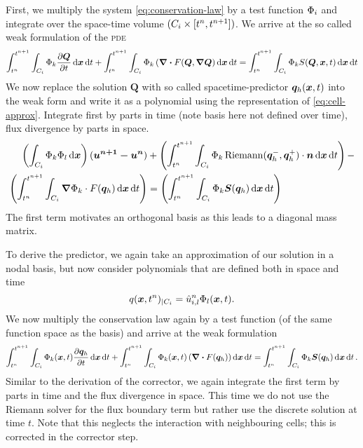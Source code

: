 First, we multiply the system \cref{eq:conservation-law} by a test function $\Phi_{i}$ and integrate over the space-time volume $(C_{i} \times [t^n, t^{n+1}])$.
We arrive at the so called weak formulation of the \textsc{pde} 
\begin{equation}
  \label{eq:weak-pde}
\intdt{\intdcell{
\testfunction{k} \pdv{\Q}{t}
}}
+
\intdt{\intdcell{
    \testfunction{k} \left( \div{F(\Q, \gradQ} \right)
}}
=
\intdt{\intdcell{
    \testfunction{k} S(\Q, \bm{x}, t)
}}
\end{equation}
We now replace the solution $\bm{Q}$ with so called spacetime-predictor $\bm{q}_{h} (\bm{x},t)$ into the weak form and write it as a polynomial using the representation of \cref{eq:cell-approx}.
Integrate first by parts in time (note basis here not defined over time), flux divergence by parts in space.
\begin{align}
\begin{split}
\label{eq:corrector}
\left(
\intdcell{
  \testfunction{k} \sbasis{l}
}
\right)
(\bm{u^{n+1} - u^{n}})
&+
\left(\intdt{\intdcell{
      \testfunction{k} \Riemann(\stpredictor^-, \stpredictor^+) \cdot \normal
}}\right)
-\\
\left(\intdt{\intdcell{
    \gradient{\testfunction{k}} \cdot  \flux(\stpredictor)
}}\right)
&=
\left(\intdt{\intdcell{
      \testfunction{k} \source(\stpredictor)
}}\right)
\end{split}
\end{align}
The first term motivates an orthogonal basis as this leads to a diagonal mass matrix.

To derive the predictor, we again take an approximation of our solution in a nodal basis, but now consider polynomials that are defined both in space and time
\begin{equation}
  \label{eq:cell-approx-space-time}
  q(\bm{x}, t^n)_{|\cell[i]} = \hat{u}^n_{i,l} \stbasis{l}(\bm{x}, t).
\end{equation}
We now multiply the conservation law again by a test function (of the same function space as the basis) and arrive at the weak formulation
\begin{equation}\label{eq:weak-pde-space-time}
\intdt{\intdcell{
    \testfunction{k}(\bm{x}, t)
    \pdv{\stpredictor}{t}
}}
+
\intdt{\intdcell{
    \testfunction{k}(\bm{x}, t)
    \left(
      \divergence{\flux(\stpredictor)}
    \right)
}}
=
\intdt{\intdcell{
  \testfunction{k} \source(\stpredictor)
}}.
\end{equation}
Similar to the derivation of the corrector, we again integrate the first term by parts in time and the flux divergence in space.
This time we do not use the Riemann solver for the flux boundary term but rather use the discrete solution at time $t$.
Note that this neglects the interaction with neighbouring cells; this is corrected in the corrector step.

